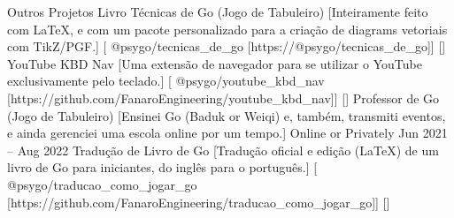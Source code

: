 \documentclass{llresume}
\begin{document}
\begin{mainpane}
    \begin{mainsection}{Outros Projetos}
        \entryGeneric
            {Livro Técnicas de Go (Jogo de Tabuleiro)}
            [Inteiramente feito com \LaTeX  , e com um pacote personalizado para a criação de diagrams vetoriais com TikZ/PGF.]
            [\infoGithub
                {@psygo/tecnicas\_de\_go}
                [https://@psygo/tecnicas\_de\_go]]
            []
        \entryGeneric
            {YouTube KBD Nav}
            [Uma extensão de navegador para se utilizar o YouTube exclusivamente pelo teclado.]
            [\infoGithub
                {@psygo/youtube\_kbd\_nav}
                [https://github.com/FanaroEngineering/youtube\_kbd\_nav]]
            []
        \entryJob
            {Professor de Go (Jogo de Tabuleiro)}
            [Ensinei Go (Baduk or Weiqi) e, também, transmiti eventos, e ainda  gerenciei uma escola online por um tempo.]
            {Online or Privately}
            {Jun 2021 -- Aug 2022}
        \entryGeneric
            {Tradução de Livro de Go}
            [Tradução oficial e edição (\LaTeX) de um livro de Go para iniciantes, do inglês para o português.]
            [\infoGithub
                {@psygo/traducao\_como\_jogar\_go}
                [https://github.com/FanaroEngineering/traducao\_como\_jogar\_go]]
            []
    \end{mainsection}
\end{mainpane}
\end{document}
